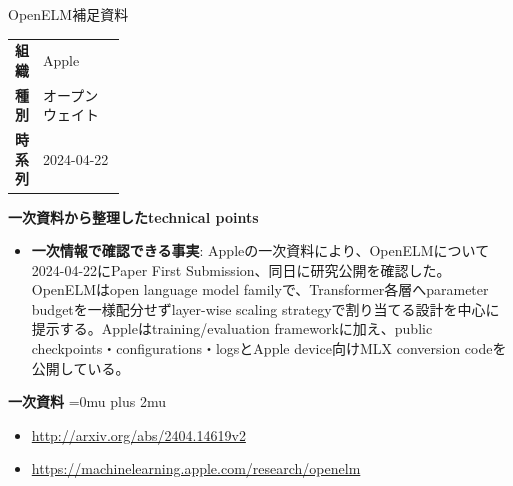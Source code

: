 \Needspace{0.38\textheight}
\begin{technicalnote}{OpenELM}{補足資料}
\begingroup
\begin{tabularx}{\linewidth}{@{}>{\bfseries}p{0.22\linewidth}X@{}}
組織 & Apple \\
種別 & オープンウェイト \\
時系列 & 2024-04-22 \\
\end{tabularx}
\smallskip
\begin{minipage}{\linewidth}
{\bfseries 一次資料から整理したtechnical points}
\begin{itemize}[leftmargin=1.5em,itemsep=0.35em]
\item \textbf{一次情報で確認できる事実}: Appleの一次資料により、OpenELMについて2024-04-22にPaper First Submission、同日に研究公開を確認した。OpenELMはopen language model familyで、Transformer各層へparameter budgetを一様配分せずlayer-wise scaling strategyで割り当てる設計を中心に提示する。Appleはtraining/evaluation frameworkに加え、public checkpoints・configurations・logsとApple device向けMLX conversion codeを公開している。
\end{itemize}
\begin{minipage}{\linewidth}
\begin{samepage}
{\bfseries 一次資料}
\begingroup\sloppy
\Urlmuskip=0mu plus 2mu\relax
\begin{itemize}[leftmargin=1.5em,itemsep=0.25em]
\item {\scriptsize\url{http://arxiv.org/abs/2404.14619v2}}
\item {\scriptsize\url{https://machinelearning.apple.com/research/openelm}}
\end{itemize}
\endgroup
\end{samepage}
\end{minipage}
\end{minipage}
\endgroup
\end{technicalnote}
\medskip
